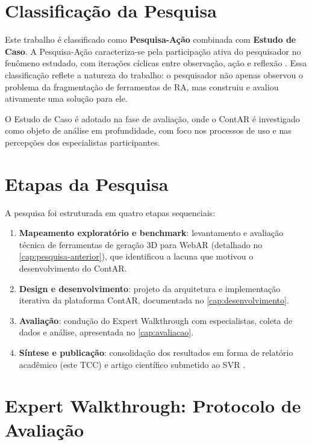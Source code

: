 \documentclass[
  12pt,
  openright,
  twoside,
  a4paper,
  english,
  brazil
]{abntex2}
\begin{document}
\section{Classificação da Pesquisa}
\label{sec:classificacao}

Este trabalho é classificado como \textbf{Pesquisa-Ação} combinada com
\textbf{Estudo de Caso}. A Pesquisa-Ação caracteriza-se pela participação
ativa do pesquisador no fenômeno estudado, com iterações cíclicas entre
observação, ação e reflexão \cite{tripp2005}. Essa classificação reflete
a natureza do trabalho: o pesquisador não apenas observou o problema da
fragmentação de ferramentas de RA, mas construiu e avaliou ativamente uma
solução para ele.

O Estudo de Caso é adotado na fase de avaliação, onde o ContAR é investigado
como objeto de análise em profundidade, com foco nos processos de uso e
nas percepções dos especialistas participantes.

\section{Etapas da Pesquisa}
\label{sec:etapas}

A pesquisa foi estruturada em quatro etapas sequenciais:

\begin{enumerate}
  \item \textbf{Mapeamento exploratório e benchmark}: levantamento e avaliação
        técnica de ferramentas de geração 3D para WebAR (detalhado no
        \autoref{cap:pesquisa-anterior}), que identificou a lacuna que
        motivou o desenvolvimento do ContAR.
  \item \textbf{Design e desenvolvimento}: projeto da arquitetura e
        implementação iterativa da plataforma ContAR, documentada no
        \autoref{cap:desenvolvimento}.
  \item \textbf{Avaliação}: condução do Expert Walkthrough com especialistas,
        coleta de dados e análise, apresentada no \autoref{cap:avaliacao}.
  \item \textbf{Síntese e publicação}: consolidação dos resultados em forma
        de relatório acadêmico (este TCC) e artigo científico submetido ao
        SVR \cite{freitas2025contar}.
\end{enumerate}

\section{Expert Walkthrough: Protocolo de Avaliação}
\label{sec:expert-walkthrough}
\end{document}
